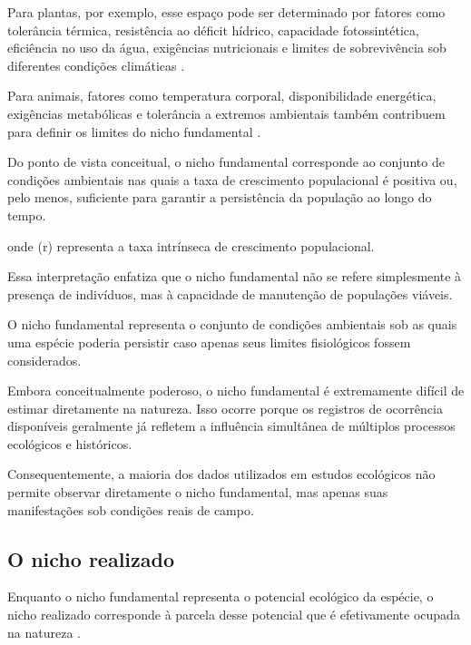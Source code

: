 Para plantas, por exemplo, esse espaço pode ser determinado por fatores como tolerância térmica, resistência ao déficit hídrico, capacidade fotossintética, eficiência no uso da água, exigências nutricionais e limites de sobrevivência sob diferentes condições climáticas \parencite{woodward1987,lambers2008}.

Para animais, fatores como temperatura corporal, disponibilidade energética, exigências metabólicas e tolerância a extremos ambientais também contribuem para definir os limites do nicho fundamental \parencite{angilletta2009}.

Do ponto de vista conceitual, o nicho fundamental corresponde ao conjunto de condições ambientais nas quais a taxa de crescimento populacional é positiva ou, pelo menos, suficiente para garantir a persistência da população ao longo do tempo.

\begin{equationbox}
	[
	r > 0
	]
\end{equationbox}

onde (r) representa a taxa intrínseca de crescimento populacional.

Essa interpretação enfatiza que o nicho fundamental não se refere simplesmente à presença de indivíduos, mas à capacidade de manutenção de populações viáveis.

\begin{conceito}
	O nicho fundamental representa o conjunto de condições ambientais sob as quais uma espécie poderia persistir caso apenas seus limites fisiológicos fossem considerados.
\end{conceito}

Embora conceitualmente poderoso, o nicho fundamental é extremamente difícil de estimar diretamente na natureza. Isso ocorre porque os registros de ocorrência disponíveis geralmente já refletem a influência simultânea de múltiplos processos ecológicos e históricos.

Consequentemente, a maioria dos dados utilizados em estudos ecológicos não permite observar diretamente o nicho fundamental, mas apenas suas manifestações sob condições reais de campo.

\subsection{O nicho realizado}

Enquanto o nicho fundamental representa o potencial ecológico da espécie, o nicho realizado corresponde à parcela desse potencial que é efetivamente ocupada na natureza \parencite{hutchinson1957,pulliam2000}.

